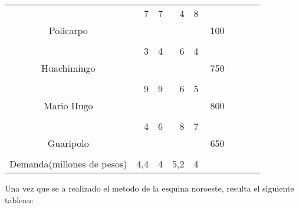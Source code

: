 \documentclass[12pt,letterpaper]{article}
\begin{document}
\begin{center}
\begin{tabular}{ccc|ccc|ccc|ccc|ccc|ccc|ccc}
\cline{1-15}
\multicolumn{3}{c|}{} & \multicolumn{3}{r|}{7} & \multicolumn{3}{r|}{7} & \multicolumn{3}{r|}{4} & \multicolumn{3}{r|}{8} \\
\multicolumn{3}{c|}{Policarpo} & \multicolumn{3}{c|}{} & \multicolumn{3}{c|}{} & \multicolumn{3}{c|}{} & \multicolumn{3}{c|}{}& \multicolumn{3}{c}{100}\\
\multicolumn{3}{c|}{} & \multicolumn{3}{c|}{} & \multicolumn{3}{c|}{} & \multicolumn{3}{c|}{} & \multicolumn{3}{c|}{}\\
\cline{1-15}
\multicolumn{3}{c|}{} & \multicolumn{3}{r|}{3} & \multicolumn{3}{r|}{4} & \multicolumn{3}{r|}{6} & \multicolumn{3}{r|}{4} \\
\multicolumn{3}{c|}{Huachimingo} & \multicolumn{3}{c|}{} & \multicolumn{3}{c|}{} & \multicolumn{3}{c|}{} & \multicolumn{3}{c|}{}& \multicolumn{3}{c}{750}\\
\multicolumn{3}{c|}{} & \multicolumn{3}{c|}{} & \multicolumn{3}{c|}{} & \multicolumn{3}{c|}{} & \multicolumn{3}{c|}{}\\
\cline{1-15}
\multicolumn{3}{c|}{} & \multicolumn{3}{r|}{9} & \multicolumn{3}{r|}{9} & \multicolumn{3}{r|}{6} & \multicolumn{3}{r|}{5} \\
\multicolumn{3}{c|}{Mario Hugo} & \multicolumn{3}{c|}{} & \multicolumn{3}{c|}{} & \multicolumn{3}{c|}{} & \multicolumn{3}{c|}{}& \multicolumn{3}{c}{800}\\
\multicolumn{3}{c|}{} & \multicolumn{3}{c|}{} & \multicolumn{3}{c|}{} & \multicolumn{3}{c|}{} & \multicolumn{3}{c|}{}\\
\cline{1-15}
\multicolumn{3}{c|}{} & \multicolumn{3}{r|}{4} & \multicolumn{3}{r|}{6} & \multicolumn{3}{r|}{8} & \multicolumn{3}{r|}{7} \\
\multicolumn{3}{c|}{Guaripolo} & \multicolumn{3}{c|}{} & \multicolumn{3}{c|}{} & \multicolumn{3}{c|}{} & \multicolumn{3}{c|}{}& \multicolumn{3}{c}{650}\\
\multicolumn{3}{c|}{} & \multicolumn{3}{c|}{} & \multicolumn{3}{c|}{} & \multicolumn{3}{c|}{} & \multicolumn{3}{c|}{}\\
\cline{1-15}
\multicolumn{3}{c|}{Demanda(millones de pesos)} & \multicolumn{3}{c|}{4,4} & \multicolumn{3}{c|}{4} & \multicolumn{3}{c|}{5,2}& \multicolumn{3}{c|}{4} & \multicolumn{3}{c}{}\\

\end{tabular}
\end{center}
Una vez que se a realizado el metodo de la esquina noroeste, resulta el siguiente tableau:
\end{document}
